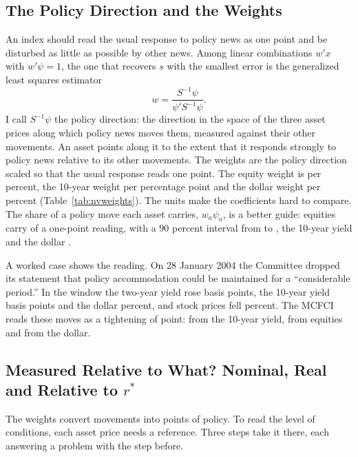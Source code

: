 \documentclass[11pt]{article}
\newcommand{\rs}{r^{*}}
\begin{document}
\subsection{The Policy Direction and the Weights}\label{sec:weights}
An index should read the usual response to policy news as one point and be disturbed as little as possible by other news. Among linear combinations $w'x$ with $w'\psi=1$, the one that recovers $s$ with the smallest error is the generalized least squares estimator
\begin{equation}\label{eq:weights}
w=\frac{S^{-1}\psi}{\psi'S^{-1}\psi} .
\end{equation}
I call $S^{-1}\psi$ the policy direction: the direction in the space of the three asset prices along which policy news moves them, measured against their other movements. An asset points along it to the extent that it responds strongly to policy news relative to its other movements. The weights are the policy direction scaled so that the usual response reads one point. The equity weight is  per percent, the 10-year weight  per percentage point and the dollar weight  per percent (Table~\ref{tab:nvweights}). The units make the coefficients hard to compare. The share of a policy move each asset carries, $w_a\psi_a$, is a better guide: equities carry  of a one-point reading, with a 90 percent interval from  to , the 10-year yield  and the dollar .



A worked case shows the reading. On 28 January 2004 the Committee dropped its statement that policy accommodation could be maintained for a ``considerable period.'' In the window the two-year yield rose  basis points, the 10-year yield  basis points and the dollar  percent, and stock prices fell  percent. The MCFCI reads these moves as a tightening of  point:  from the 10-year yield,  from equities and  from the dollar.

\subsection{Measured Relative to What? Nominal, Real and Relative to $\rs$}\label{sec:steps}
The weights convert movements into points of policy. To read the level of conditions, each asset price needs a reference. Three steps take it there, each answering a problem with the step before.
\end{document}
